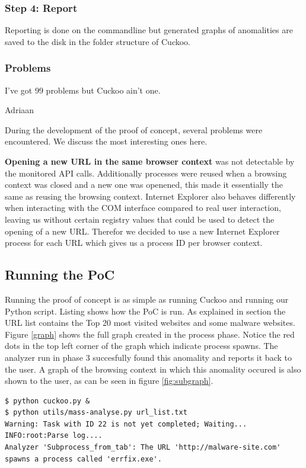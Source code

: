 \subsubsection{Step 4: Report}

Reporting is done on the commandline but generated graphs of anomalities are saved to the disk in the folder structure of Cuckoo.

\subsubsection{Problems}
\label{99problems}
\epigraph{I've got 99 problems but Cuckoo ain't one.}{Adriaan}

During the development of the proof of concept, several problems were encountered. We discuss the most interesting ones here.

\textbf{Opening a new URL in the same browser context} was not detectable by the monitored API calls. Additionally processes were reused when a browsing context was closed and a new one was openened, this made it essentially the same as reusing the browsing context. Internet Explorer also behaves differently when interacting with the COM interface compared to real user interaction, leaving us without certain registry values that could be used to detect the opening of a new URL. Therefor we decided to use a new Internet Explorer process for each URL which gives us a process ID per browser context.

\subsection{Running the PoC}

Running the proof of concept is as simple as running Cuckoo and running our Python script. Listing  shows how the PoC is run. As explained in section  the URL list contains the Top 20 most visited websites and some malware websites. Figure \ref{graph} shows the full graph created in the process phase. Notice the red dots in the top left corner of the graph which indicate process spawns. The analyzer run in phase 3 succesfully found this anomality and reports it back to the user. A graph of the browsing context in which this anomality occured is also shown to the user, as can be seen in figure \ref{fig:subgraph}.

\begin{lstlisting}
$ python cuckoo.py &
$ python utils/mass-analyse.py url_list.txt
Warning: Task with ID 22 is not yet completed; Waiting...
INFO:root:Parse log....
Analyzer 'Subprocess_from_tab': The URL 'http://malware-site.com' 
spawns a process called 'errfix.exe'.
\end{lstlisting}

